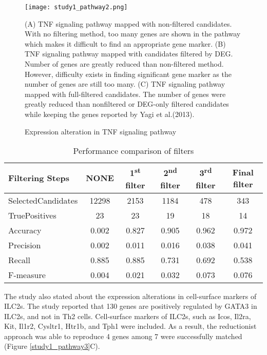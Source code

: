 \documentclass[oneside,phd]{snuthesis}
\begin{document}
\begin{figure*}
\begin{center}
\texttt{[image: study1\_pathway2.png]}
\end{center}
\caption{Expression alteration in TNF signaling pathway \citep{hur2015combined}}
\scriptsize{
{(A) TNF signaling pathway mapped with non-filtered candidates. With no filtering method, too many genes are shown in the pathway which makes it difficult to find an appropriate gene marker. 
(B) TNF signaling pathway mapped with candidates filtered by DEG.
Number of genes are greatly reduced than non-filtered method. However, difficulty exists in finding significant gene marker as the number of genes are still too many. 
(C) TNF signaling pathway mapped with full-filtered candidates. The number of genes were greatly reduced than nonfiltered or DEG-only filtered candidates while keeping the genes reported by Yagi et al.(2013).}}
\label{study1_pathway2}
\end{figure*}

\begin{table}
\centering
\begin{tabular}{l || c c c c c}
\hline
Filtering Steps& NONE  &  1\textsuperscript{st} filter  &  2\textsuperscript{nd} filter  &  3\textsuperscript{rd} filter & Final filter \\ \hline \hline
SelectedCandidates & 12298 & 2153  & 1184  & 478   & 343   \\ 
TruePositives      & 23    & 23    & 19    & 18    & 14    \\ \hline
Accuracy           & 0.002 & 0.827 & 0.905 & 0.962 & 0.972 \\ 
Precision          & 0.002 & 0.011 & 0.016 & 0.038 & 0.041 \\ 
Recall             & 0.885 & 0.885 & 0.731 & 0.692 & 0.538 \\ 
F-measure          & 0.004 & 0.021 & 0.032 & 0.073 & 0.076 \\ \hline
\end{tabular}
\caption{Performance comparison of filters}
\label{1st_table}
\end{table}

The study also stated about the expression alterations in cell-surface markers of ILC2s. 
The study reported that 130 genes are positively regulated by GATA3 in ILC2s, and not in Th2 cells. 
Cell-surface markers of ILC2s, such as Icos, Il2ra, Kit, Il1r2, Cysltr1, Htr1b, and Tph1 were included.
As a result, the reductionist approach was able to reproduce 4 genes among 7 were successfully matched (Figure \ref{study1_pathway3}C).
\end{document}
